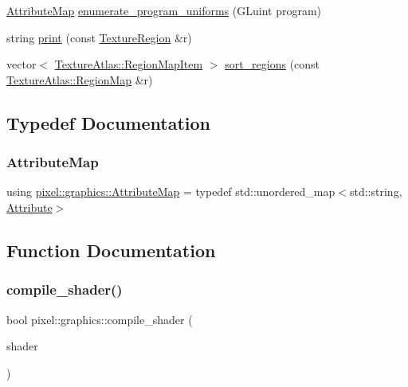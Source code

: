 \begin{DoxyCompactItemize}
\item 
\hyperlink{namespacepixel_1_1graphics_ab235534714f227408c552e912c5985de}{Attribute\+Map} \hyperlink{namespacepixel_1_1graphics_ac505118e74ccefdc82a0aa08169cf061}{enumerate\+\_\+program\+\_\+uniforms} (G\+Luint program)
\item 
string \hyperlink{namespacepixel_1_1graphics_a44589d6f0ddb29511d27537157f85d45}{print} (const \hyperlink{structpixel_1_1graphics_1_1_texture_region}{Texture\+Region} \&r)
\item 
vector$<$ \hyperlink{classpixel_1_1graphics_1_1_texture_atlas_a0bc1372e4dd1c78eeeba84caf3485e11}{Texture\+Atlas\+::\+Region\+Map\+Item} $>$ \hyperlink{namespacepixel_1_1graphics_ae4b234b0f578905813c98f9dff28d8ee}{sort\+\_\+regions} (const \hyperlink{classpixel_1_1graphics_1_1_texture_atlas_adcb359d1961bd99f8eeb35f456df1e0c}{Texture\+Atlas\+::\+Region\+Map} \&r)
\end{DoxyCompactItemize}


\subsection{Typedef Documentation}
\mbox{\label{namespacepixel_1_1graphics_ab235534714f227408c552e912c5985de}} 
\subsubsection{\texorpdfstring{Attribute\+Map}{AttributeMap}}
{\footnotesize\ttfamily using \hyperlink{namespacepixel_1_1graphics_ab235534714f227408c552e912c5985de}{pixel\+::graphics\+::\+Attribute\+Map} = typedef std\+::unordered\+\_\+map$<$std\+::string, \hyperlink{structpixel_1_1graphics_1_1_attribute}{Attribute}$>$}



\subsection{Function Documentation}
\mbox{\label{namespacepixel_1_1graphics_a46b2582a20b7efd452ad00943782116f}} 
\subsubsection{\texorpdfstring{compile\+\_\+shader()}{compile\_shader()}}
{\footnotesize\ttfamily bool pixel\+::graphics\+::compile\+\_\+shader (\begin{DoxyParamCaption}\item[{G\+Luint}]{shader }\end{DoxyParamCaption})}

